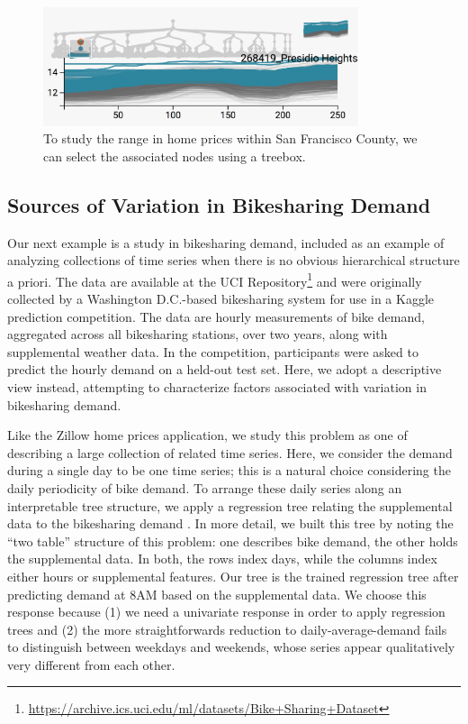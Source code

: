 \documentclass[12pt]{article}
\begin{document}
\begin{figure}

{\centering \includegraphics[width=350px]{figure/zillow_sf}

}

\caption{To study the range in home prices within San Francisco County, we can
  select the associated nodes using a treebox.}\label{fig:zillowsf}
\end{figure}

\subsection{Sources of Variation in Bikesharing
Demand}\label{bikesharing-study}

Our next example is a study in bikesharing demand, included as an
example of analyzing collections of time series when there is no obvious
hierarchical structure a priori. The data are available at the UCI
Repository\footnote{\url{https://archive.ics.uci.edu/ml/datasets/Bike+Sharing+Dataset}}
and were originally collected by a Washington D.C.-based bikesharing
system for use in a Kaggle prediction competition. The data are hourly
measurements of bike demand, aggregated across all bikesharing stations,
over two years, along with supplemental weather data. In the
competition, participants were asked to predict the hourly demand on a
held-out test set. Here, we adopt a descriptive view instead, attempting
to characterize factors associated with variation in bikesharing demand.

Like the Zillow home prices application, we study this problem as one of
describing a large collection of related time series. Here, we consider
the demand during a single day to be one time series; this is a natural
choice considering the daily periodicity of bike demand. To arrange
these daily series along an interpretable tree structure, we apply a
regression tree relating the supplemental data to the bikesharing demand
\citep{breiman1984classification}. In more
detail, we built this tree by noting the ``two table'' structure of this
problem: one describes bike demand, the other holds the supplemental
data. In both, the rows index days, while the columns index either hours
or supplemental features. Our tree is the trained regression tree after
predicting demand at 8AM based on the supplemental data. We choose this
response because (1) we need a univariate response in order to apply
regression trees and (2) the more straightforwards reduction to
daily-average-demand fails to distinguish between weekdays and weekends,
whose series appear qualitatively very different from each other.
\end{document}
